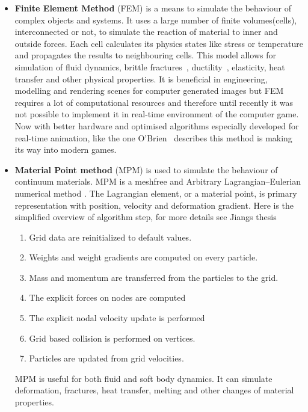 \begin{itemize}

\item \textbf{Finite Element Method} (FEM) is a means to simulate the behaviour of complex objects and systems.  It uses a large number of finite volumes(cells), interconnected or not, to simulate the reaction of material to inner and outside forces. Each cell calculates its physics states like stress or temperature and propagates the results to neighbouring cells. This model allows for simulation of fluid dynamics, brittle fractures~\cite{brittlefracture}, ductility~\cite{ductilefracture}, elasticity, heat transfer and other physical properties. It is beneficial in engineering, modelling and rendering scenes for computer generated images but FEM requires a lot of computational resources and therefore until recently it was not possible to implement it in real-time environment of the computer game. Now with better hardware and optimised algorithms especially developed for real-time animation, like the one O'Brien~\cite{femingames} describes this method is making its way into modern games.

\item \textbf{Material Point method} (MPM) is used to simulate the behaviour of continuum materials. MPM is a meshfree and Arbitrary Lagrangian–Eulerian numerical method \cite{ALE}. The Lagrangian element, or a material point, is primary representation with position, velocity and deformation gradient. Here is the simplified overview of algorithm step, for more details see Jiangs thesis~\cite{jiang2015material} 
\begin{enumerate}
    \item Grid data are reinitialized to default values.
    \item Weights and weight gradients are computed on every particle.
    \item Mass and momentum are transferred from the particles to the grid.
    \item The explicit forces on nodes are computed
    \item The explicit nodal velocity update is performed
    \item Grid based collision is performed on vertices.
    \item Particles are updated from grid velocities.
\end{enumerate}
MPM is useful for both fluid and soft body dynamics. It can simulate deformation, fractures, heat transfer, melting and other changes of material properties.


\end{itemize}
